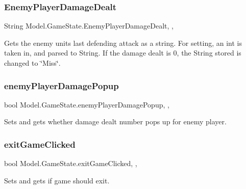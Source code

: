 \subsubsection{\texorpdfstring{Enemy\+Player\+Damage\+Dealt}{EnemyPlayerDamageDealt}}
{\footnotesize\ttfamily String Model.\+Game\+State.\+Enemy\+Player\+Damage\+Dealt\hspace{0.3cm}{\ttfamily [static]}, {\ttfamily [get]}, {\ttfamily [set]}}

Gets the enemy unit\textquotesingle{}s last defending attack as a string. For setting, an int is taken in, and parsed to String. If the damage dealt is 0, the String stored is changed to \char`\"{}\+Miss\char`\"{}. \hypertarget{class_model_1_1_game_state_af42c3aff2e08038bbc07d696f36fdd4b}{}\label{class_model_1_1_game_state_af42c3aff2e08038bbc07d696f36fdd4b} 
\subsubsection{\texorpdfstring{enemy\+Player\+Damage\+Popup}{enemyPlayerDamagePopup}}
{\footnotesize\ttfamily bool Model.\+Game\+State.\+enemy\+Player\+Damage\+Popup\hspace{0.3cm}{\ttfamily [static]}, {\ttfamily [get]}, {\ttfamily [set]}}

Sets and gets whether damage dealt number pops up for enemy player. \hypertarget{class_model_1_1_game_state_a0ee0eff828bc31ce69967d7ef04588b8}{}\label{class_model_1_1_game_state_a0ee0eff828bc31ce69967d7ef04588b8} 
\subsubsection{\texorpdfstring{exit\+Game\+Clicked}{exitGameClicked}}
{\footnotesize\ttfamily bool Model.\+Game\+State.\+exit\+Game\+Clicked\hspace{0.3cm}{\ttfamily [static]}, {\ttfamily [get]}, {\ttfamily [set]}}

Sets and gets if game should exit. \hypertarget{class_model_1_1_game_state_a2274be2a54b2c7b70b81213a07804b75}{}\label{class_model_1_1_game_state_a2274be2a54b2c7b70b81213a07804b75} 
